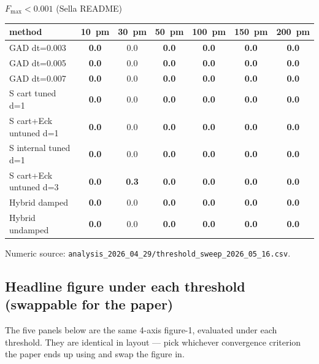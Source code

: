 \documentclass[11pt]{article}
\begin{document}
\begin{center}\footnotesize
\textbf{$F_\mathrm{max}<0.001$} (Sella README)\\[0.3em]
\begin{tabular}{l|cccccc}
\toprule
\textbf{method} & \textbf{10~pm} & \textbf{30~pm} & \textbf{50~pm} & \textbf{100~pm} & \textbf{150~pm} & \textbf{200~pm} \\
\midrule
GAD dt=0.003                   & \textbf{0.0} & 0.0 & \textbf{0.0} & \textbf{0.0} & \textbf{0.0} & \textbf{0.0} \\
GAD dt=0.005                   & \textbf{0.0} & 0.0 & \textbf{0.0} & \textbf{0.0} & \textbf{0.0} & \textbf{0.0} \\
GAD dt=0.007                   & \textbf{0.0} & 0.0 & \textbf{0.0} & \textbf{0.0} & \textbf{0.0} & \textbf{0.0} \\
\midrule
S cart tuned d=1               & \textbf{0.0} & 0.0 & \textbf{0.0} & \textbf{0.0} & \textbf{0.0} & \textbf{0.0} \\
S cart+Eck untuned d=1         & \textbf{0.0} & 0.0 & \textbf{0.0} & \textbf{0.0} & \textbf{0.0} & \textbf{0.0} \\
S internal tuned d=1           & \textbf{0.0} & 0.0 & \textbf{0.0} & \textbf{0.0} & \textbf{0.0} & \textbf{0.0} \\
S cart+Eck untuned d=3         & \textbf{0.0} & \textbf{0.3} & \textbf{0.0} & \textbf{0.0} & \textbf{0.0} & \textbf{0.0} \\
\midrule
Hybrid damped                  & \textbf{0.0} & 0.0 & \textbf{0.0} & \textbf{0.0} & \textbf{0.0} & \textbf{0.0} \\
Hybrid undamped                & \textbf{0.0} & 0.0 & \textbf{0.0} & \textbf{0.0} & \textbf{0.0} & \textbf{0.0} \\
\bottomrule
\end{tabular}
\end{center}

Numeric source: \texttt{analysis\_2026\_04\_29/threshold\_sweep\_2026\_05\_16.csv}.

\subsection{Headline figure under each threshold (swappable for the paper)}

The five panels below are the same 4-axis figure-1, evaluated under each
threshold. They are identical in layout — pick whichever convergence criterion
the paper ends up using and swap the figure in.
\end{document}
